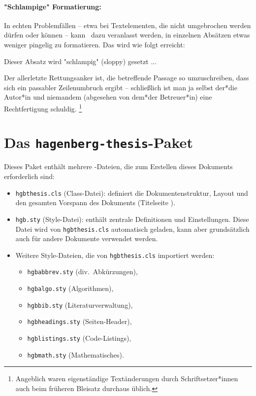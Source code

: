 \paragraph{"Schlampige" Formatierung:} In echten Problemfällen -- etwa bei
Textelementen, die nicht umgebrochen werden dürfen oder können -- kann
\latex\ dazu veranlasst werden, in einzelnen Absätzen etwas weniger pingelig
zu formatieren. Das wird wie folgt erreicht:
%
\begin{LaTeXCode}[numbers=none]
\begin{sloppypar}
	Dieser Absatz wird "schlampig" (sloppy) gesetzt ...
\end{sloppypar}
\end{LaTeXCode}
%
Der allerletzte Rettungsanker ist, die betreffende Passage so umzuschreiben,
dass sich ein passabler Zeilenumbruch ergibt -- schließlich ist man ja selbst
der*die Autor*in und niemandem (abgesehen von dem*der Betreuer*in) eine
Rechtfertigung schuldig.%
\footnote{Angeblich waren eigenständige Textänderungen durch Schriftsetzer*innen
auch beim früheren Bleisatz durchaus üblich.}


\section{Das \texttt{hagenberg-thesis}-Paket}

Dieses Paket enthält mehrere \latex-Dateien, die zum Erstellen dieses
Dokuments erforderlich sind:
%
\begin{itemize}
    \item \nolinkurl{hgbthesis.cls} (Class-Datei): definiert die
    Dokumentenstruktur, Layout und den gesamten Vorspann des Dokuments
    (Titelseite \etc).
    \item \nolinkurl{hgb.sty} (Style-Datei): enthält zentrale Definitionen
    und Einstellungen. Diese Datei wird von \nolinkurl{hgbthesis.cls}
    automatisch geladen, kann aber grundsätzlich auch für andere Dokumente
    verwendet werden.
    \item Weitere Style-Dateien, die von \nolinkurl{hgbthesis.cls} importiert
    werden:
    \begin{itemize}
        \item[] \nolinkurl{hgbabbrev.sty} (div.\ Abkürzungen),
        \item[] \nolinkurl{hgbalgo.sty} (Algorithmen),
        \item[] \nolinkurl{hgbbib.sty} (Literaturverwaltung),
        \item[] \nolinkurl{hgbheadings.sty} (Seiten-Header),
        \item[] \nolinkurl{hgblistings.sty} (Code-Listings),
        \item[] \nolinkurl{hgbmath.sty} (Mathematisches).
    \end{itemize}
\end{itemize}


